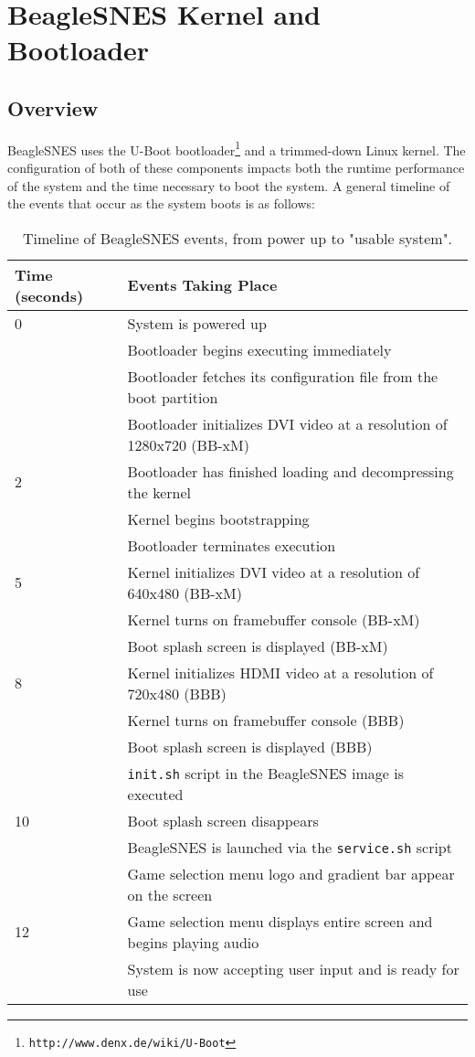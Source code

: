 \chapter{BeagleSNES Kernel and Bootloader}

\section{Overview}

BeagleSNES uses the U-Boot bootloader\footnote{\texttt{http://www.denx.de/wiki/U-Boot}} and a trimmed-down Linux kernel.  The configuration of both of these components impacts both the runtime performance of the system and the time necessary to boot the system.  A general timeline of the events that occur as the system boots is as follows:

\begin{table}[h]
\centering
\begin{tabular}{| l | l |} \hline
\textbf{Time (seconds)} & \textbf{Events Taking Place}\\ \hline
0 & System is powered up \\
& Bootloader begins executing immediately \\
& Bootloader fetches its configuration file from the boot partition \\ 
& Bootloader initializes DVI video at a resolution of 1280x720 (BB-xM)\\ \hline
2 & Bootloader has finished loading and decompressing the kernel \\
& Kernel begins bootstrapping \\ 
& Bootloader terminates execution \\ \hline
5 & Kernel initializes DVI video at a resolution of 640x480 (BB-xM) \\
& Kernel turns on framebuffer console (BB-xM) \\
& Boot splash screen is displayed (BB-xM) \\ \hline
8 & Kernel initializes HDMI video at a resolution of 720x480 (BBB) \\
& Kernel turns on framebuffer console (BBB) \\
& Boot splash screen is displayed (BBB) \\ 
& \texttt{init.sh} script in the BeagleSNES image is executed \\ \hline
10 & Boot splash screen disappears \\
& BeagleSNES is launched via the \texttt{service.sh} script \\
& Game selection menu logo and gradient bar appear on the screen \\ \hline
12 & Game selection menu displays entire screen and begins playing audio \\
& System is now accepting user input and is ready for use \\ \hline
\end{tabular}
\caption{Timeline of BeagleSNES events, from power up to "usable system".}
\end{table}


